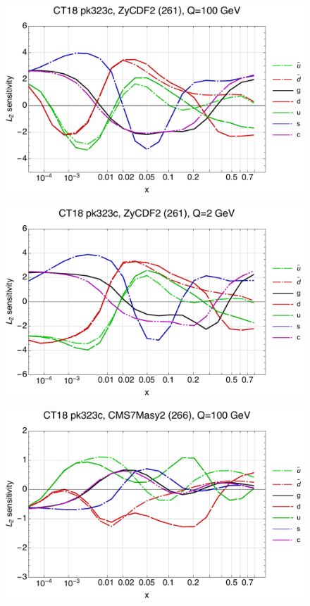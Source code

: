 \documentclass[10pt,aps,prd,floatfix,titlepage]{revtex4}
\begin{document}
\clearpage
\begin{figure}
\includegraphics[width=\textwidth,height=0.44\textheight,keepaspectratio]{1/261_ct18nn_L2_q100_Sf_1.pdf}
\caption{}
\end{figure}
\begin{figure}
\includegraphics[width=\textwidth,height=0.44\textheight,keepaspectratio]{1/261_ct18nn_L2_q2_Sf_1.pdf}
\caption{}
\end{figure}
\clearpage
\begin{figure}
\includegraphics[width=\textwidth,height=0.44\textheight,keepaspectratio]{1/266_ct18nn_L2_q100_Sf_1.pdf}
\caption{}
\end{figure}
\end{document}
